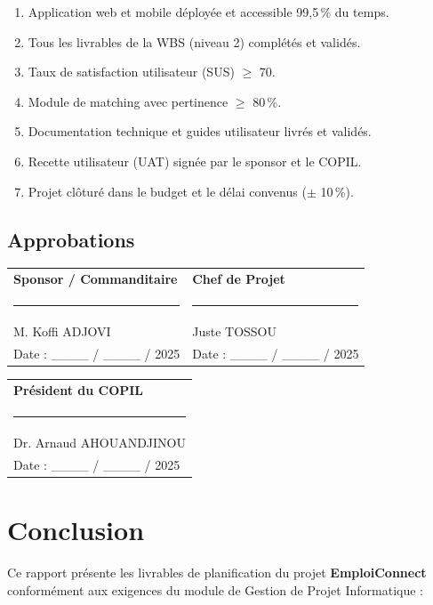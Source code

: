 \documentclass[11pt,a4paper]{article}
\begin{document}
\begin{enumerate}
    \item Application web et mobile déployée et accessible 99,5\,\% du temps.
    \item Tous les livrables de la WBS (niveau 2) complétés et validés.
    \item Taux de satisfaction utilisateur (SUS) $\geq$ 70.
    \item Module de matching avec pertinence $\geq$ 80\,\%.
    \item Documentation technique et guides utilisateur livrés et validés.
    \item Recette utilisateur (UAT) signée par le sponsor et le COPIL.
    \item Projet clôturé dans le budget et le délai convenus ($\pm$ 10\,\%).
\end{enumerate}

\subsection{Approbations}

\vspace{1.5em}
\noindent
\begin{tabularx}{\textwidth}{@{}X X@{}}
    \textbf{Sponsor / Commanditaire} & \textbf{Chef de Projet} \\[2em]
    \rule{6cm}{0.4pt} & \rule{6cm}{0.4pt} \\
    M. Koffi ADJOVI & Juste TOSSOU \\
    Date : \_\_\_\_ / \_\_\_\_ / 2025 & Date : \_\_\_\_ / \_\_\_\_ / 2025 \\
\end{tabularx}

\vspace{1em}
\noindent
\begin{tabularx}{\textwidth}{@{}X@{}}
    \textbf{Président du COPIL} \\[2em]
    \rule{6cm}{0.4pt} \\
    Dr. Arnaud AHOUANDJINOU \\
    Date : \_\_\_\_ / \_\_\_\_ / 2025 \\
\end{tabularx}

\section{Conclusion}

Ce rapport présente les livrables de planification du projet \textbf{EmploiConnect} conformément aux exigences du module de Gestion de Projet Informatique :
\end{document}
